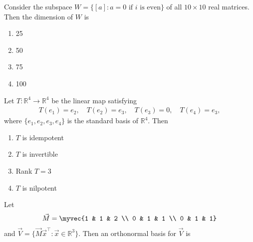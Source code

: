 \item Consider the subspace \(W = \{[a]: a=0 \text{ if } i \text{ is even}\}\) of all \(10 \times 10\) real matrices. Then the dimension of \(W\) is
\hfill{}
\begin{multicols}{4}
\begin{enumerate}
\item 25
\item 50
\item 75
\item 100
\end{enumerate}
\end{multicols}
\item
Let $T:\mathbb{R}^4 \to \mathbb{R}^4$ be the linear map satisfying
\begin{align*}
    T(e_1) = e_2,\quad T(e_2) = e_3,\quad T(e_3) = 0,\quad T(e_4) = e_3,
\end{align*}
where $\{e_1, e_2, e_3, e_4\}$ is the standard basis of $\mathbb{R}^4$. Then
\hfill{}
\begin{multicols}{2}
\begin{enumerate}
\item $T$ is idempotent
\item $T$ is invertible
\item Rank $T = 3$
\item $T$ is nilpotent
\end{enumerate}

\end{multicols}
\item
Let 
\begin{align*}
    \vec{M} = \myvec{1 & 1 & 2 \\ 0 & 1 & 1 \\ 0 & 1 & 1}
\end{align*}
and $\vec{V} = \{ \vec{M} \vec{x}^{\top} : \vec{x} \in \mathbb{R}^3 \}$. Then an orthonormal basis for $\vec{V}$ is
\hfill{}
